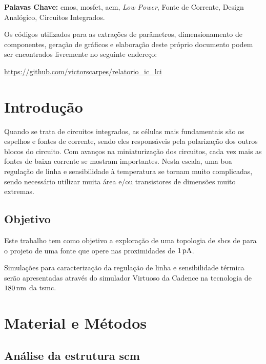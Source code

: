 \documentclass[10pt,a4paper]{extreport}
\newcommand{\?}{\stackrel{?}{=}}
\newcommand{\sis}[2]{\complexnum{#1}\,\si[per-mode=symbol]{#2}}
\begin{document}
\textbf{Palavas Chave:} \acrshort{cmos}, \acrshort{mosfet}, \acrshort{acm}, \textit{Low Power}, Fonte de Corrente, Design Analógico, Circuitos Integrados.

\newpage
{}
\listoffigures
\newpage
{}
\printglossary[type=\acronymtype, title=Lista de Siglas e Acrônimos]


\newpage
Os códigos utilizados para as extrações de parâmetros, dimensionamento de componentes, geração de gráficos e elaboração deste próprio documento podem ser encontrados livremente no seguinte endereço:

\url{https://github.com/victorscarpes/relatorio_ic_lci}

\newpage

\setcounter{chapter}{0}
\chapter{Introdução}

Quando se trata de circuitos integrados, as células mais fundamentais são os espelhos e fontes de corrente, sendo eles responsáveis pela polarização dos outros blocos do circuito. Com avanços na miniaturização dos circuitos, cada vez mais as fontes de baixa corrente se mostram importantes. Nesta escala, uma boa regulação de linha e sensibilidade à temperatura se tornam muito complicadas, sendo necessário utilizar muita área e/ou transistores de dimensões muito extremas.

\section{Objetivo}

Este trabalho tem como objetivo a exploração de uma topologia de \acrfull{sbcs} de \cite{sbcs} para o projeto de uma fonte que opere nas proximidades de $\sis{1}{\pico\ampere}$.

Simulações para caracterização da regulação de linha e sensibilidade térmica serão apresentadas através do simulador Virtuoso da Cadence na tecnologia de $\sis{180}{\nano\meter}$ da \acrfull{tsmc}.

\chapter{Material e Métodos}
\section{Análise da estrutura \acrshort{scm}}
\end{document}

